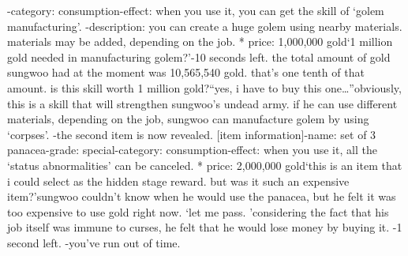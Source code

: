 -category: consumption-effect: when you use it, you can get the skill of ‘golem manufacturing’.
-description: you can create a huge golem using nearby materials.
 materials may be added, depending on the job.
* price: 1,000,000 gold‘1 million gold needed in manufacturing golem?’-10 seconds left.
the total amount of gold sungwoo had at the moment was 10,565,540 gold.
 that’s one tenth of that amount.
 is this skill worth 1 million gold?“yes, i have to buy this one…”obviously, this is a skill that will strengthen sungwoo’s undead army.
 if he can use different materials, depending on the job, sungwoo can manufacture golem by using ‘corpses’.
-the second item is now revealed.
[item information]-name: set of 3 panacea-grade: special-category: consumption-effect: when you use it, all the ‘status abnormalities’ can be canceled.
* price: 2,000,000 gold‘this is an item that i could select as the hidden stage reward.
 but was it such an expensive item?’sungwoo couldn’t know when he would use the panacea, but he felt it was too expensive to use gold right now.
‘let me pass.
’considering the fact that his job itself was immune to curses, he felt that he would lose money by buying it.
-1 second left.
-you’ve run out of time.


 